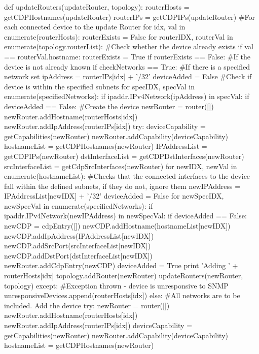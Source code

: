 \documentclass[11pt]{report}
\begin{document}
\begin{python}
def updateRouters(updateRouter, topology):
	routerHosts = getCDPHostnames(updateRouter)
	routerIPs = getCDPIPs(updateRouter)
	#For each connected device to the update Router
	for idx, val in enumerate(routerHosts):
		routerExists = False
		for routerIDX, routerVal in enumerate(topology.routerList):
			#Check whether the device already exists
			if val == routerVal.hostname:
				routerExists = True
		if routerExists == False:
			#If the device is not already known
			if checkNetworks == True:
				#If there is a specified network set
				ipAddress = routerIPs[idx] + '/32'
				deviceAdded = False
				#Check if device is within the specified subnets
				for specIDX, specVal in enumerate(specifiedNetworks):
					if ipaddr.IPv4Network(ipAddress) in specVal:
						if deviceAdded == False:
							#Create the device
							newRouter = router([])
							newRouter.addHostname(routerHosts[idx])
							newRouter.addIpAddress(routerIPs[idx])
							try:
								deviceCapability = getCapabilities(newRouter)
								newRouter.addCapability(deviceCapability)
								hostnameList = getCDPHostnames(newRouter)
								IPAddressList = getCDPIPs(newRouter)
								dstInterfaceList = getCDPDstInterfaces(newRouter)
								srcInterfaceList = getCdpSrcInterfaces(newRouter)
								for newIDX, newVal in enumerate(hostnameList):
									#Checks that the connected interfaces to the device fall within the defined subnets, if they do not, ignore them
									newIPAddress = IPAddressList[newIDX] + '/32'
									deviceAdded = False
									for newSpecIDX, newSpecVal in enumerate(specifiedNetworks):
										if ipaddr.IPv4Network(newIPAddress) in newSpecVal:
											if deviceAdded == False:
												newCDP = cdpEntry([])
												newCDP.addHostname(hostnameList[newIDX])
												newCDP.addIpAddress(IPAddressList[newIDX])
												newCDP.addSrcPort(srcInterfaceList[newIDX])
												newCDP.addDstPort(dstInterfaceList[newIDX])
												newRouter.addCdpEntry(newCDP)
												deviceAdded = True
				print 'Adding ' + routerHosts[idx]
				topology.addRouter(newRouter)
				updateRouters(newRouter, topology)
			except:
				#Exception thrown - device is unresponsive to SNMP
				unresponsiveDevices.append(routerHosts[idx])
	else:
		#All networks are to be included. Add the device
		try:
			newRouter = router([])
			newRouter.addHostname(routerHosts[idx])
			newRouter.addIpAddress(routerIPs[idx])
			deviceCapability = getCapabilities(newRouter)
			newRouter.addCapability(deviceCapability)
			hostnameList = getCDPHostnames(newRouter)

\end{python}
\end{document}
